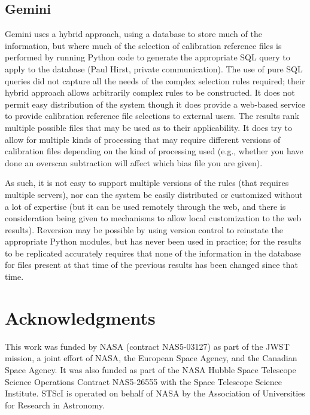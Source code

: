 \documentclass[final,authoryear,5p,times,twocolumn]{elsarticle}
\begin{document}
\subsection{Gemini}

Gemini uses a hybrid approach, using a database to store much of the 
information, but where much of the selection of calibration reference 
files is performed by running Python code to generate the appropriate 
SQL query to apply to the database (Paul Hirst, private communication). 
The use of pure SQL queries did not capture all the needs of the 
complex selection rules required; their hybrid approach allows arbitrarily
complex rules to be constructed. It does not permit easy distribution of the 
system though it does provide a web-based service to provide calibration 
reference file selections to external users. The results rank multiple 
possible files that may be used as to their applicability. It does try 
to allow for multiple kinds of processing that may require different 
versions of calibration files depending on the kind of processing used 
(e.g., whether you have done an overscan subtraction will affect which 
bias file you are given). 

As such, it is not easy to support multiple 
versions of the rules (that requires multiple servers), nor can the 
system be easily distributed or customized without a lot of expertise 
(but it can be used remotely through the web, and there is consideration 
being given to mechanisms to allow local customization to the web results). 
Reversion may be possible by using version control to reinstate the 
appropriate Python modules, but has never been used in practice; 
for the results to be replicated accurately requires that none of the
information in the database for files present at that time of the previous
results has been changed since that time.



\section{Acknowledgments}

This work was funded by NASA (contract NAS5-03127) as part of the JWST mission, a joint effort of NASA, the European Space Agency, and the Canadian Space Agency. It was also funded as part of the NASA Hubble Space Telescope Science Operations Contract NAS5-26555 with the Space Telescope Science Institute.
STScI is operated on behalf of NASA by the Association of Universities for Research in Astronomy.
\end{document}
